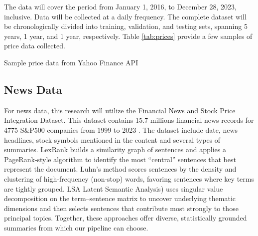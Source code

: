 The data will cover the period from January 1, 2016, to December 28, 2023, inclusive. Data will be collected at a daily frequency. The complete dataset will be chronologically divided into training, validation, and testing sets, spanning 5 years, 1 year, and 1 year, respectively. Table \ref{tab:prices} provide a few samples of price data collected.

\begin{table}
  \centering
  \caption{Sample price data from Yahoo Finance API}
  \label{tab:prices}
\end{table}

\subsection{News Data}
For news data, this research will utilize the Financial News and Stock Price Integration Dataset. This dataset contains 15.7 millions financial news records for 4775 S\&P500 companies from 1999 to 2023 \cite{Dong2024}. The dataset include date, news headlines, stock symbols mentioned in the content and several types of summaries. LexRank builds a similarity graph of sentences and applies a PageRank‐style algorithm to identify the most “central” sentences that best represent the document. Luhn’s method scores sentences by the density and clustering of high‐frequency (non‐stop) words, favoring sentences where key terms are tightly grouped. \gls{LSA} Latent Semantic Analysis) uses singular value decomposition on the term–sentence matrix to uncover underlying thematic dimensions and then selects sentences that contribute most strongly to those principal topics. Together, these approaches offer diverse, statistically grounded summaries from which our pipeline can choose.

